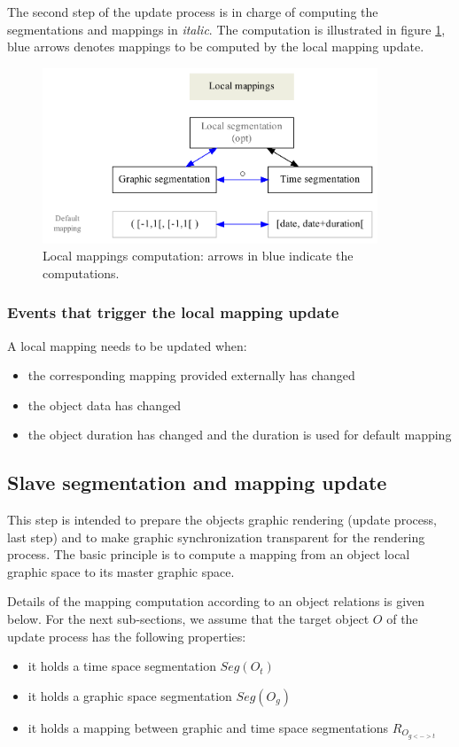 \documentclass[a4paper]{article}
\newcommand{\seg}[1]		{Seg(#1)}
\begin{document}
The second step of the update process is in charge of computing the segmentations and mappings in \textit{italic}.
The computation is illustrated in figure \ref{localmap}, blue arrows denotes mappings to be computed by the local mapping update.
\begin{figure}[h]
	\centering \includegraphics[width=100mm]{rsrc/localmappings}
 \caption{Local mappings computation: arrows in blue indicate the computations.}
 \label{localmap}
\end{figure}

\subsubsection{Events that trigger the local mapping update}
A local mapping needs to be updated when:
\begin{itemize}
\item the corresponding mapping provided externally has changed
\item the object data has changed
\item the object duration has changed and the duration is used for default mapping
\end{itemize}


\subsection{Slave segmentation and mapping update}

This step is intended to prepare the objects graphic rendering (update process, last step) and to make graphic synchronization transparent for the rendering process. The basic principle is to compute a mapping from an object local graphic space to its master graphic space. 

Details of the mapping computation according to an object relations is given below. For the next sub-sections, we assume that the target object $O$ of the update process has the following properties:
\vspace{-2mm}
\begin{itemize}
\item it holds a time space segmentation $\seg{O_{t}}$
\item it holds a graphic space segmentation $\seg{O_{g}}$
\item it holds a mapping between graphic and time space segmentations $R_{O_{g<->t}}$
\end{itemize}
\end{document}
